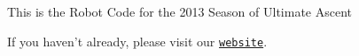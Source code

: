 \-This is the \-Robot \-Code for the 2013 \-Season of \-Ultimate \-Ascent

\-If you haven't already, please visit our \href{http://www.amhsrobotics.com}{\tt website}. 
